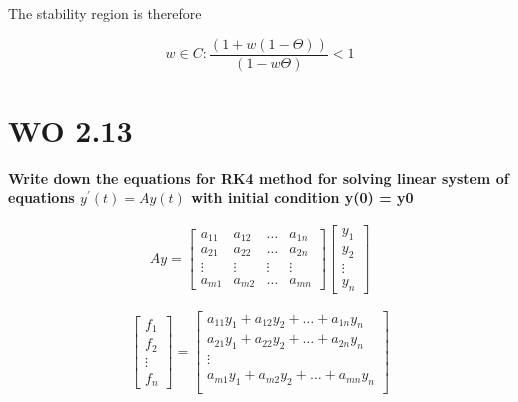 \documentclass[a4paper]{article}
\begin{document}
The stability region is therefore

\begin{equation}
 w \in C : \frac{(1 + w(1 - \Theta))} {(1 - w \Theta )}  < 1
\end{equation}


\section*{WO 2.13}
\textbf{Write down the equations for RK4 method for solving linear system of equations $y^{\prime}(t) = Ay(t)$ with initial condition y(0) = y0}

\begin{equation}
\begin{aligned}
Ay = \begin{bmatrix} a_{11}& a_{12}& \ldots& a_{1n} \\
                    a_{21}& a_{22}& \ldots& a_{2n} \\
                    \vdots& \vdots& \vdots& \vdots \\
                    a_{m1}& a_{m2}& \ldots& a_{mn} \end{bmatrix} 
                    \begin{bmatrix} y_1 \\ y_2\\ \vdots \\ y_n \end{bmatrix}
\end{aligned}
\end{equation}

\begin{equation}
\begin{bmatrix} f_1 \\ f_2 \\ \vdots \\ f_n  \end{bmatrix} =
\begin{bmatrix} a_{11}y_1 + a_{12}y_2 + \ldots + a_{1n}y_n \\
                a_{21}y_1 + a_{22}y_2 + \ldots + a_{2n}y_n \\
                \vdots \\
                a_{m1}y_1 + a_{m2}y_2 + \ldots + a_{mn}y_n \\
                 \end{bmatrix}
\end{equation}
\end{document}
